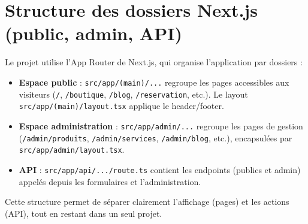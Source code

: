 \section{Structure des dossiers Next.js (public, admin, API)}
Le projet utilise l’App Router de Next.js, qui organise l’application par dossiers :
\begin{itemize}
    \item \textbf{Espace public} : \texttt{src/app/(main)/...} regroupe les pages accessibles aux visiteurs (\texttt{/}, \texttt{/boutique}, \texttt{/blog}, \texttt{/reservation}, etc.). Le layout \texttt{src/app/(main)/layout.tsx} applique le header/footer.
    \item \textbf{Espace administration} : \texttt{src/app/admin/...} regroupe les pages de gestion (\texttt{/admin/produits}, \texttt{/admin/services}, \texttt{/admin/blog}, etc.), encapsulées par \texttt{src/app/admin/layout.tsx}.
    \item \textbf{API} : \texttt{src/app/api/.../route.ts} contient les endpoints (publics et admin) appelés depuis les formulaires et l’administration.
\end{itemize}
Cette structure permet de séparer clairement l’affichage (pages) et les actions (API), tout en restant dans un seul projet.

